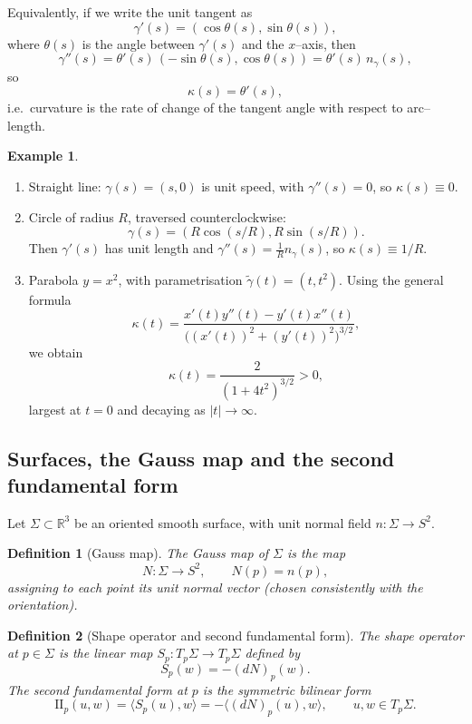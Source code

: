 \documentclass[12pt,a4paper]{article}
\newcommand{\II}{\mathrm{I\!I}}
\theoremstyle{plain}
\newtheorem{definition}{Definition}
\theoremstyle{definition}      %
\newtheorem{example}[theorem]{Example}
\begin{document}
Equivalently, if we write the unit tangent as
\[
\gamma'(s) = (\cos\theta(s),\sin\theta(s)),
\]
where $\theta(s)$ is the angle between $\gamma'(s)$ and the $x$--axis,
then
\[
\gamma''(s) = \theta'(s)\,(-\sin\theta(s),\cos\theta(s))
= \theta'(s)\,n_\gamma(s),
\]
so
\[
\kappa(s) = \theta'(s),
\]
i.e.\ curvature is the rate of change of the tangent angle with respect
to arc--length.

\begin{example}
	\leavevmode
	\begin{enumerate}
		\item Straight line: $\gamma(s)=(s,0)$ is unit speed, with
		$\gamma''(s)=0$, so $\kappa(s)\equiv0$.
		
		\item Circle of radius $R$, traversed counterclockwise:
		\[
		\gamma(s)=(R\cos(s/R),R\sin(s/R)).
		\]
		Then $\gamma'(s)$ has unit length and
		$\gamma''(s)=\frac{1}{R}n_\gamma(s)$, so $\kappa(s)\equiv1/R$.
		
		\item Parabola $y=x^2$, with parametrisation $\tilde\gamma(t)=(t,t^2)$.
		Using the general formula
		\[
		\kappa(t)=\frac{x'(t)y''(t)-y'(t)x''(t)}
		{\bigl((x'(t))^2+(y'(t))^2\bigr)^{3/2}},
		\]
		we obtain
		\[
		\kappa(t)=\frac{2}{(1+4t^2)^{3/2}}>0,
		\]
		largest at $t=0$ and decaying as $|t|\to\infty$.
	\end{enumerate}
\end{example}

\subsection{Surfaces, the Gauss map and the second fundamental form}

Let $\Sigma\subset\mathbb{R}^3$ be an oriented smooth surface, with
unit normal field $n:\Sigma\to S^2$.

\begin{definition}[Gauss map]
	The \emph{Gauss map} of $\Sigma$ is the map
	\[
	N:\Sigma\to S^2,\qquad N(p)=n(p),
	\]
	assigning to each point its unit normal vector (chosen consistently with
	the orientation).
\end{definition}

\begin{definition}[Shape operator and second fundamental form]
	The \emph{shape operator} at $p\in\Sigma$ is the linear map
	$S_p:T_p\Sigma\to T_p\Sigma$ defined by
	\[
	S_p(w) = - (dN)_p(w).
	\]
	The \emph{second fundamental form} at $p$ is the symmetric bilinear form
	\[
	\II_p(u,w) = \langle S_p(u),w\rangle
	= -\langle(dN)_p(u),w\rangle,
	\qquad u,w\in T_p\Sigma.
	\]
\end{definition}
\end{document}
